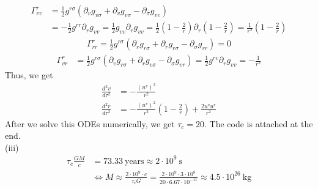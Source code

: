 \documentclass[12pt]{article}
\begin{document}
\begin{align}
\Gamma^{r}_{vv} &= \frac{1}{2} g^{r \sigma} \left(\partial_{v} g_{v \sigma} + \partial_{v} g_{v \sigma} - \partial_{\sigma} g_{vv}\right)\\
&= - \frac{1}{2} g^{r r} \partial_{r} g_{vv} = \frac{1}{2} g_{vv} \partial_{r} g_{vv}  = \frac{1}{2} \left(1 - \frac{2}{r} \right) \partial_{r} \left(1 - \frac{2}{r} \right) = \frac{1}{r^2} \left(1 - \frac{2}{r} \right)
\end{align}
\begin{align}
\Gamma^{r}_{rr} = \frac{1}{2} g^{r \sigma} \left(\partial_{r} g_{r \sigma} + \partial_{r} g_{r \sigma} - \partial_{\sigma} g_{r r}\right) = 0
\end{align}
\begin{align}
\Gamma^{r}_{vr} &= \frac{1}{2} g^{r \sigma} \left(\partial_{v} g_{r \sigma} + \partial_{r} g_{v \sigma} - \partial_{\sigma} g_{v r}\right)
= \frac{1}{2} g^{r v} \partial_{r} g_{v v} = - \frac{1}{r^2}
\end{align}
Thus, we get
\begin{align}
\frac{d^2 v}{d \tau^2} &= - \frac{\left(u^{v}\right)^2}{r^2}\\
\frac{d^2 r}{d \tau^2} &= - \frac{\left(u^{v}\right)^2}{r^2} \left(1 - \frac{2}{r} \right) + \frac{2u^{v} u^{r}}{r^2} 
\end{align}
After we solve this ODEs numerically, we get $\tau_{c} = 20$. The code is attached at the end.\\
(iii)
\begin{align}
\tau_{c} \frac{GM}{c}  &= 73.33 ~\mathrm{years} \approx 2\cdot 10^9 ~\mathrm{s}\\
&\Leftrightarrow M \approx \frac{2\cdot 10^9\cdot c}{\tau_{c} G} = \frac{2\cdot 10^9\cdot 3 \cdot 10^8}{20 \cdot 6.67 \cdot 10^{-11}} \approx 
4.5 \cdot 10^{26}~\mathrm{kg}
\end{align}
\end{document}
